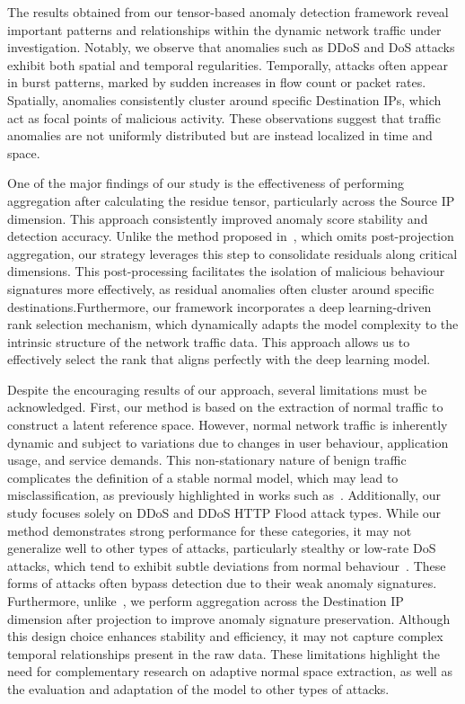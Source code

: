 \documentclass{ieeeaccess}
\begin{document}
The results obtained from our tensor-based anomaly detection framework reveal important patterns and relationships within the dynamic network traffic under investigation. Notably, we observe that anomalies such as DDoS and DoS attacks exhibit both spatial and temporal regularities. Temporally, attacks often appear in burst patterns, marked by sudden increases in flow count or packet rates. Spatially, anomalies consistently cluster around specific Destination IPs, which act as focal points of malicious activity. These observations suggest that traffic anomalies are not uniformly distributed but are instead localized in time and space.

One of the major findings of our study is the effectiveness of performing aggregation after calculating the residue tensor, particularly across the Source IP dimension. This approach consistently improved anomaly score stability and detection accuracy. Unlike the method proposed in~\cite{streit2021network}, which omits post-projection aggregation, our strategy leverages this step to consolidate residuals along critical dimensions. This post-processing facilitates the isolation of malicious behaviour signatures more effectively, as residual anomalies often cluster around specific destinations.Furthermore, our framework incorporates a deep learning-driven rank selection mechanism, which dynamically adapts the model complexity to the intrinsic structure of the network traffic data. This approach allows us to effectively select the rank that aligns perfectly with the deep learning model.


Despite the encouraging results of our approach, several limitations must be acknowledged. First, our method is based on the extraction of normal traffic to construct a latent reference space. However, normal network traffic is inherently dynamic and subject to variations due to changes in user behaviour, application usage, and service demands. This non-stationary nature of benign traffic complicates the definition of a stable normal model, which may lead to misclassification, as previously highlighted in works such as~\cite{limitation2023generalization}. Additionally, our study focuses solely on DDoS and DDoS HTTP Flood attack types. While our method demonstrates strong performance for these categories, it may not generalize well to other types of attacks, particularly stealthy or low-rate DoS attacks, which tend to exhibit subtle deviations from normal behaviour~\cite{al2021machine}. These forms of attacks often bypass detection due to their weak anomaly signatures. Furthermore, unlike~\cite{streit2021network}, we perform aggregation across the Destination IP dimension after projection to improve anomaly signature preservation. Although this design choice enhances stability and efficiency, it may not capture complex temporal relationships present in the raw data. These limitations highlight the need for complementary research on adaptive normal space extraction, as well as the evaluation and adaptation of the model to other types of attacks.
\end{document}
